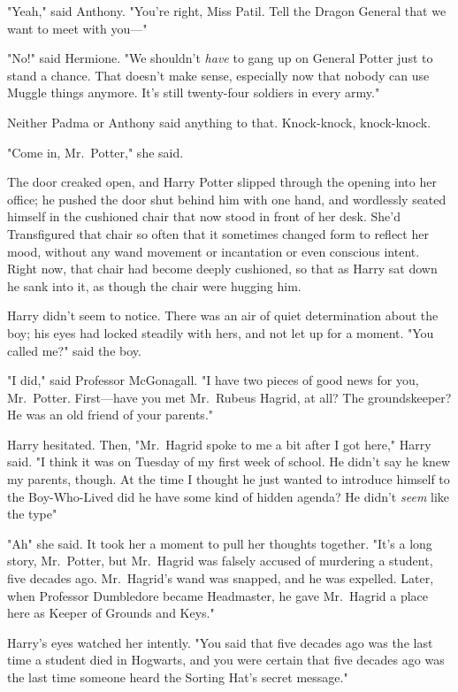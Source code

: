 "Yeah," said Anthony. "You're right, Miss Patil. Tell the Dragon General that
we want to meet with you\mbox{---}"

"No!" said Hermione. "We shouldn't \emph{have} to gang up on General Potter
just to stand a chance. That doesn't make sense, especially now that nobody can
use Muggle things anymore. It's still twenty-four soldiers in every army."

Neither Padma or Anthony said anything to that.
\sbreak
Knock-knock, knock-knock.

"Come in, Mr.~Potter," she said.

The door creaked open, and Harry Potter slipped through the opening into her
office; he pushed the door shut behind him with one hand, and wordlessly seated
himself in the cushioned chair that now stood in front of her desk. She'd
Transfigured that chair so often that it sometimes changed form to reflect her
mood, without any wand movement or incantation or even conscious intent. Right
now, that chair had become deeply cushioned, so that as Harry sat down he sank
into it, as though the chair were hugging him.

Harry didn't seem to notice. There was an air of quiet determination about the
boy; his eyes had locked steadily with hers, and not let up for a moment. "You
called me?" said the boy.

"I did," said Professor McGonagall. "I have two pieces of good news for you,
Mr.~Potter. First---have you met Mr.~Rubeus Hagrid, at all? The groundskeeper?
He was an old friend of your parents."

Harry hesitated. Then, "Mr.~Hagrid spoke to me a bit after I got here," Harry
said. "I think it was on Tuesday of my first week of school. He didn't say he
knew my parents, though. At the time I thought he just wanted to introduce
himself to the Boy-Who-Lived{\el} did he have some kind of hidden agenda? He
didn't \emph{seem} like the type{\el}"

"Ah{\el}" she said. It took her a moment to pull her thoughts together.
"It's a long story, Mr.~Potter, but Mr.~Hagrid was falsely accused of murdering
a student, five decades ago. Mr.~Hagrid's wand was snapped, and he was
expelled. Later, when Professor Dumbledore became Headmaster, he gave
Mr.~Hagrid a place here as Keeper of Grounds and Keys."

Harry's eyes watched her intently. "You said that five decades ago was the last
time a student died in Hogwarts, and you were certain that five decades ago was
the last time someone heard the Sorting Hat's secret message."

